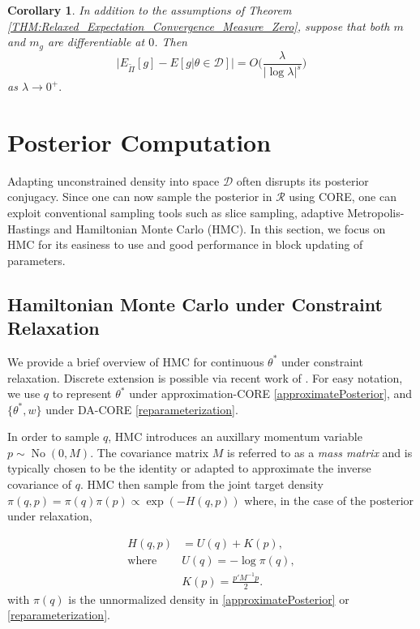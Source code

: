 \documentclass[10pt,fleqn]{article}
\newtheorem{corollary}{Corollary}
\newcommand{\mc}[1]{\mathcal{#1}}
\DeclareMathOperator{\No}{No}
\DeclareMathOperator{\1}{\mathbbm{1}}
\newcommand{\mass}{M} %
\begin{document}
{\begin{corollary}
In addition to the assumptions of Theorem \ref{THM:Relaxed_Expectation_Convergence_Measure_Zero}, suppose that both $m$ and $m_g$ are differentiable at $0$. Then
$$\bigg|E_{\tilde{\Pi}}[g] - E[g|\theta \in \mathcal{D}] \bigg| = O\bigg(\frac{\lambda}{|\log \lambda|^s}\bigg)$$
as $\lambda \to 0^+.$
\end{corollary}

}
 
\section{Posterior Computation}

Adapting  unconstrained density into space $\mc D$ often disrupts its posterior conjugacy. Since one can now sample the posterior in $\mc R$ using
 CORE, one can exploit conventional sampling tools such as slice sampling, adaptive Metropolis-Hastings and Hamiltonian Monte Carlo (HMC). In this section, we focus on HMC for its easiness to use and good performance in block updating of parameters.

\subsection{Hamiltonian Monte Carlo under Constraint Relaxation}

We provide a brief overview of HMC for continuous $\theta^*$ under constraint relaxation. Discrete extension is possible via recent work of \cite{nishimura2017discontinuous}. For easy notation, we use $q$ to represent $\theta^*$ under approximation-CORE \eqref{approximatePosterior}, and $\{\theta^*, w\}$ under DA-CORE \eqref{reparameterization}.

In order to sample $q$, HMC introduces an auxillary momentum variable $p \sim \No(0, \mass)$. The covariance matrix $\mass$ is referred to as a \textit{mass matrix} and is typically chosen to be the identity or adapted to approximate the inverse covariance of $q$. HMC then sample from the joint target density $\pi(q, p) = \pi(q) \pi(p) \propto \exp (- H(q, p))$ where, in the case of the posterior under relaxation, 


\begin{equation}
\begin{aligned}
H(q, p)& = U(q)+K(p),\\
\text{where } & U(q) = -\log\pi(q),\\
& K(p) = \frac{p'\mass^{-1} p}{2}.
\end{aligned}
\end{equation}
with $\pi(q)$ is the unnormalized density in \eqref{approximatePosterior} or \eqref{reparameterization}. %
\end{document}
